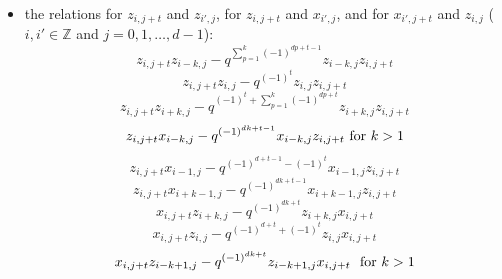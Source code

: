 \documentclass[reqno,12pt,a4paper]{amsart}
\theoremstyle{remark}
\theoremstyle{definition}
\numberwithin{equation}{section}
\begin{document}
\begin{itemize}
	\item[(3)] the relations for $z_{i,j+t}$ and $z_{i',j}$, for $z_{i,j+t}$ and $x_{i',j}$, and for $x_{i',j+t}$ and $z_{i,j}$ ($i,i'\in\mathbb{Z}$ and $j=0,1,\ldots,d-1$):
	\begin{equation*}
		z_{i,j+t}z_{i-k,j}-q^{\sum\limits_{p=1}^{k}(-1)^{dp+t-1}}z_{i-k,j}z_{i,j+t}
	\end{equation*}
	\begin{equation*}
		z_{i,j+t}z_{i,j}-q^{(-1)^t}z_{i,j}z_{i,j+t}
	\end{equation*}
	\begin{equation*}
		z_{i,j+t}z_{i+k,j}-q^{(-1)^t+\sum\limits_{p=1}^{k}(-1)^{dp+t}}z_{i+k,j}z_{i,j+t}
	\end{equation*}
	\begin{equation*}
		z_{i,j+t}x_{i-k,j}-q^{(-1)^{dk+t-1}}x_{i-k,j}z_{i,j+t}		~\hbox{for $k>1$}
	\end{equation*}
	\begin{equation*}
		z_{i,j+t}x_{i-1,j}-q^{(-1)^{d+t-1}-(-1)^{t} }x_{i-1,j}z_{i,j+t}
	\end{equation*}
	\begin{equation*}
		z_{i,j+t}x_{i+k-1,j}-q^{(-1)^{dk+t-1}}x_{i+k-1,j}z_{i,j+t}
	\end{equation*}
	\begin{equation*}
		x_{i,j+t}z_{i+k,j}-q^{(-1)^{dk+t}}z_{i+k,j}x_{i,j+t}
	\end{equation*}
	\begin{equation*}
		x_{i,j+t}z_{i,j}-q^{(-1)^{d+t}+(-1)^t}z_{i,j}x_{i,j+t}
	\end{equation*}
	\begin{equation*}
		x_{i,j+t}z_{i-k+1,j}-q^{(-1)^{dk+t}}z_{i-k+1,j}x_{i,j+t} ~\hbox{ for $k>1$}
	\end{equation*}
\end{itemize}
\end{document}
